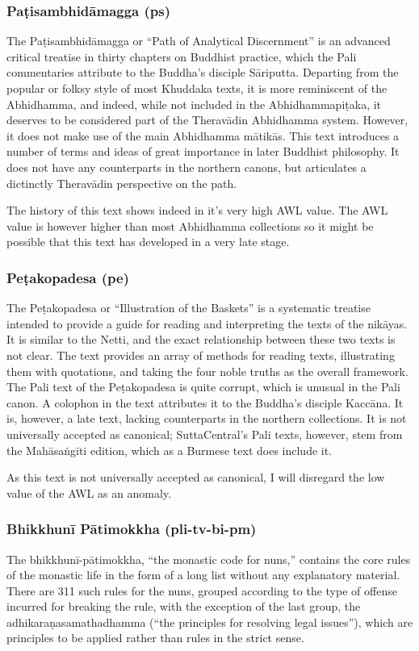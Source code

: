 \subsubsection{Paṭisambhidāmagga (ps)}
The Paṭisambhidāmagga or “Path of Analytical Discernment” is an advanced critical treatise in thirty chapters on Buddhist practice, which the Pali commentaries attribute to the Buddha’s disciple Sāriputta. Departing from the popular or folksy style of most Khuddaka texts, it is more reminiscent of the Abhidhamma, and indeed, while not included in the Abhidhammapiṭaka, it deserves to be considered part of the Theravādin Abhidhamma system. However, it does not make use of the main Abhidhamma mātikās. This text introduces a number of terms and ideas of great importance in later Buddhist philosophy. It does not have any counterparts in the northern canons, but articulates a dictinctly Theravādin perspective on the path.

The history of this text shows indeed in it's very high AWL value. The AWL value is however higher than most Abhidhamma collections so it might be possible that this text has developed in a very late stage.

\subsubsection{Peṭakopadesa (pe)}
The Peṭakopadesa or “Illustration of the Baskets” is a systematic treatise intended to provide a guide for reading and interpreting the texts of the nikāyas. It is similar to the Netti, and the exact relationship between these two texts is not clear. The text provides an array of methods for reading texts, illustrating them with quotations, and taking the four noble truths as the overall framework. The Pali text of the Peṭakopadesa is quite corrupt, which is unusual in the Pali canon. A colophon in the text attributes it to the Buddha's disciple Kaccāna. It is, however, a late text, lacking counterparts in the northern collections. It is not universally accepted as canonical; SuttaCentral’s Pali texts, however, stem from the Mahāsaṅgīti edition, which as a Burmese text does include it.

As this text is not universally accepted as canonical, I will disregard the low value of the AWL as an anomaly.

\subsubsection{Bhikkhunī Pātimokkha (pli-tv-bi-pm)}
The bhikkhunī-pātimokkha, “the monastic code for nuns,” contains the core rules of the monastic life in the form of a long list without any explanatory material. There are 311 such rules for the nuns, grouped according to the type of offense incurred for breaking the rule, with the exception of the last group, the adhikaraṇasamathadhamma (“the principles for resolving legal issues”), which are principles to be applied rather than rules in the strict sense.

